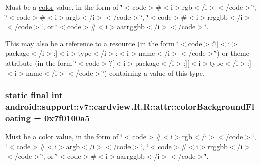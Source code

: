 Must be a \hyperlink{classandroid_1_1support_1_1v7_1_1cardview_1_1_r_1_1color}{color} value, in the form of \char`\"{}$<$code$>$\#$<$i$>$rgb$<$/i$>$$<$/code$>$\char`\"{}, \char`\"{}$<$code$>$\#$<$i$>$argb$<$/i$>$$<$/code$>$\char`\"{}, \char`\"{}$<$code$>$\#$<$i$>$rrggbb$<$/i$>$$<$/code$>$\char`\"{}, or \char`\"{}$<$code$>$\#$<$i$>$aarrggbb$<$/i$>$$<$/code$>$\char`\"{}. 

This may also be a reference to a resource (in the form \char`\"{}$<$code$>$@\mbox{[}$<$i$>$package$<$/i$>$:\mbox{]}$<$i$>$type$<$/i$>$:$<$i$>$name$<$/i$>$$<$/code$>$\char`\"{}) or theme attribute (in the form \char`\"{}$<$code$>$?\mbox{[}$<$i$>$package$<$/i$>$:\mbox{]}\mbox{[}$<$i$>$type$<$/i$>$:\mbox{]}$<$i$>$name$<$/i$>$$<$/code$>$\char`\"{}) containing a value of this type. \hypertarget{classandroid_1_1support_1_1v7_1_1cardview_1_1_r_1_1attr_55eb67619a2be1f7e49f5d5fd5ed70d1}{
\subsubsection[{colorBackgroundFloating}]{\setlength{\rightskip}{0pt plus 5cm}static final int android::support::v7::cardview.R.R::attr::colorBackgroundFloating = 0x7f0100a5}}
\label{classandroid_1_1support_1_1v7_1_1cardview_1_1_r_1_1attr_55eb67619a2be1f7e49f5d5fd5ed70d1}


Must be a \hyperlink{classandroid_1_1support_1_1v7_1_1cardview_1_1_r_1_1color}{color} value, in the form of \char`\"{}$<$code$>$\#$<$i$>$rgb$<$/i$>$$<$/code$>$\char`\"{}, \char`\"{}$<$code$>$\#$<$i$>$argb$<$/i$>$$<$/code$>$\char`\"{}, \char`\"{}$<$code$>$\#$<$i$>$rrggbb$<$/i$>$$<$/code$>$\char`\"{}, or \char`\"{}$<$code$>$\#$<$i$>$aarrggbb$<$/i$>$$<$/code$>$\char`\"{}. 

